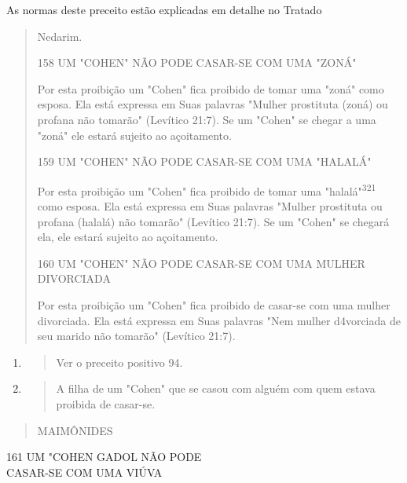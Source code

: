 As normas deste preceito estão explicadas em detalhe no Tratado

\begin{quote}
Nedarim.

158 UM "COHEN" NÃO PODE CASAR-SE COM UMA "ZONÁ"

Por esta proibição um "Cohen" fica proibido de tomar uma "zoná" como
esposa. Ela está expressa em Suas palavras "Mulher prostituta (zoná) ou
profana não tomarão" (Levítico 21:7). Se um "Cohen" se chegar a uma
"zoná" ele estará sujeito ao açoitamento.

159 UM "COHEN" NÃO PODE CASAR-SE COM UMA "HALALÁ"

Por esta proibição um "Cohen" fica proibido de tomar uma
"hala­lá"\textsuperscript{321} como esposa. Ela está expressa em Suas
palavras "Mulher prostituta ou profana (halalá) não tomarão" (Levítico
21:7). Se um "Cohen" se chegará ela, ele estará sujeito ao açoitamento.

160 UM "COHEN" NÃO PODE CASAR-SE COM UMA MULHER DIVORCIADA

Por esta proibição um "Cohen" fica proibido de casar-se com uma mulher
divorciada. Ela está expressa em Suas palavras "Nem mulher d4vorcia­da
de seu marido não tomarão" (Levítico 21:7).
\end{quote}

\begin{enumerate}
\def\labelenumi{\arabic{enumi}.}
\setcounter{enumi}{319}
\item
  \begin{quote}
  Ver o preceito positivo 94.
  \end{quote}
\item
  \begin{quote}
  A filha de um "Cohen" que se casou com alguém com quem estava proibida
  de casar-se.
  \end{quote}
\end{enumerate}

\begin{quote}
MAIMÔNIDES
\end{quote}

161 UM "COHEN GADOL NÃO PODE\\
CASAR-SE COM UMA VIÚVA

